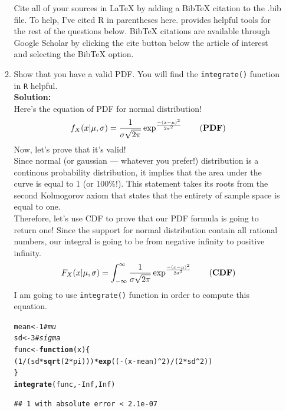 \documentclass{article}\usepackage[]{graphicx}\usepackage[]{color}
\makeatletter
\newcommand{\hlnum}[1]{\textcolor[rgb]{0.686,0.059,0.569}{#1}}%
\newcommand{\hlcom}[1]{\textcolor[rgb]{0.678,0.584,0.686}{\textit{#1}}}%
\newcommand{\hlopt}[1]{\textcolor[rgb]{0,0,0}{#1}}%
\newcommand{\hlstd}[1]{\textcolor[rgb]{0.345,0.345,0.345}{#1}}%
\newcommand{\hlkwa}[1]{\textcolor[rgb]{0.161,0.373,0.58}{\textbf{#1}}}%
\newcommand{\hlkwb}[1]{\textcolor[rgb]{0.69,0.353,0.396}{#1}}%
\newcommand{\hlkwc}[1]{\textcolor[rgb]{0.333,0.667,0.333}{#1}}%
\newcommand{\hlkwd}[1]{\textcolor[rgb]{0.737,0.353,0.396}{\textbf{#1}}}%
\newenvironment{kframe}{%
 \def\at@end@of@kframe{}%
 \ifinner\ifhmode%
  \def\at@end@of@kframe{\end{minipage}}%
  \begin{minipage}{\columnwidth}%
 \fi\fi%
 \def\FrameCommand##1{\hskip\@totalleftmargin \hskip-\fboxsep
 \colorbox{shadecolor}{##1}\hskip-\fboxsep
     \hskip-\linewidth \hskip-\@totalleftmargin \hskip\columnwidth}%
 \MakeFramed {\advance\hsize-\width
   \@totalleftmargin\z@ \linewidth\hsize
   \@setminipage}}%
 {\par\unskip\endMakeFramed%
 \at@end@of@kframe}
\newenvironment{knitrout}{}{} %
\makeatother
\begin{document}
\begin{enumerate}
\begin{enumerate}
  Cite all of your sources in LaTeX by adding a BibTeX citation to the .bib file. 
  To help, I've cited R \citep{R21} in parentheses here. \cite{R21} provides helpful 
  tools for the rest of the questions below. BibTeX citations are available through 
  Google Scholar by clicking the cite button below the article of  interest and 
  selecting the BibTeX option.
	\item Show that you have a valid PDF. You will find the \texttt{integrate()} 
	function in \texttt{R} helpful.\\
	\textbf{Solution:}\\
	Here's the equation of PDF for normal distribution!
	\begin{equation*}
	f_{X}({x|\mu,\sigma})=\frac{1}{\sigma\sqrt{2\pi}}\exp^\frac{-(x-\mu)^2}{2\sigma^2} \tag{\textbf{PDF}}
	\end{equation*}
	Now, let's prove that it's valid!\\
	Since normal (or gaussian — whatever you prefer!) distribution is a continous probability distribution, it implies that the area under the curve is equal to 1 (or 100\%!). This statement takes its roots from the second Kolmogorov axiom that states that the entirety of sample space is equal to one.\\
	Therefore, let's use CDF to prove that our PDF formula is going to return one! Since the support for normal distribution contain all rational numbers, our integral is going to be from negative infinity to positive infinity. 
	\begin{equation*}
	F_{X}({x|\mu,\sigma})=\int_{-\infty}^{\infty}\frac{1}{\sigma\sqrt{2\pi}}\exp^\frac{-(x-\mu)^2}{2\sigma^2} \tag{\textbf{CDF}}
	\end{equation*}
	I am going to use \texttt{integrate()} function in order to compute this equation.
\begin{knitrout}
\color{fgcolor}\begin{kframe}
\begin{alltt}
\hlstd{mean}\hlkwb{<-}\hlnum{1} \hlcom{#mu}
\hlstd{sd}\hlkwb{<-}\hlnum{3} \hlcom{#sigma}
\hlstd{func} \hlkwb{<-} \hlkwa{function}\hlstd{(}\hlkwc{x}\hlstd{)\{}
  \hlstd{(}\hlnum{1}\hlopt{/}\hlstd{(sd}\hlopt{*}\hlkwd{sqrt}\hlstd{(}\hlnum{2}\hlopt{*}\hlstd{pi)))}\hlopt{*}\hlkwd{exp}\hlstd{((}\hlopt{-}\hlstd{(x}\hlopt{-}\hlstd{mean)}\hlopt{^}\hlnum{2}\hlstd{)}\hlopt{/}\hlstd{(}\hlnum{2}\hlopt{*}\hlstd{sd}\hlopt{^}\hlnum{2}\hlstd{))}
\hlstd{\}}
\hlkwd{integrate}\hlstd{(func,} \hlopt{-}\hlnum{Inf}\hlstd{,} \hlnum{Inf}\hlstd{)}
\end{alltt}
\begin{verbatim}
## 1 with absolute error < 2.1e-07
\end{verbatim}
\end{kframe}
\end{knitrout}
	

\end{enumerate}
\end{enumerate}
\end{document}
